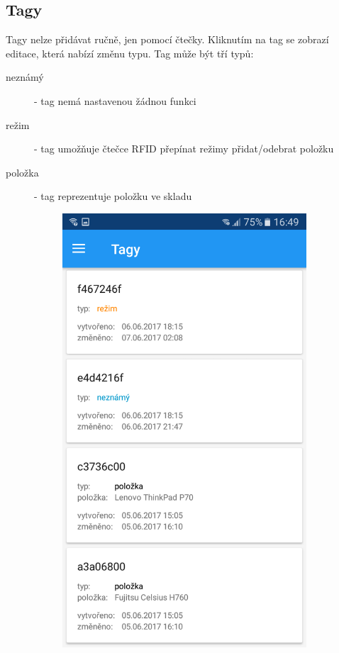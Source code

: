 \documentclass[czech,BP]{thesiskiv}
\begin{document}
\subsection{Tagy}
Tagy nelze přidávat ručně, jen pomocí čtečky. Kliknutím na tag se zobrazí editace, která nabízí změnu typu. Tag může být tří typů:
\begin{description}
\item [neznámý] - tag nemá nastavenou žádnou funkci
\item [režim] - tag umožňuje čtečce RFID přepínat režimy přidat/odebrat položku
\item [položka] - tag reprezentuje položku ve skladu 
\end{description}
\begin{figure}[H]
	\centering
  \begin{subfigure}[b]{0.3\textwidth}
    \centering
	\includegraphics[width=\textwidth]{../images/client_android/Screenshot_20170607-164958.png}	

\end{subfigure}
\end{figure}
\end{document}
